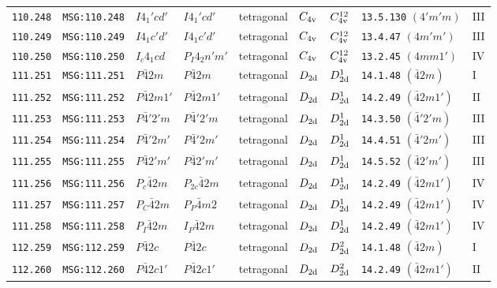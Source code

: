 \documentclass[fleqn,10pt]{jsarticle}
\begin{document}
\begin{center}
\begin{longtable}{lllllllll}
\texttt{110.248} & \texttt{MSG:110.248} & $I4_{1}'cd'$ & $I4_{1}'cd'$ & tetragonal & $C_{\rm 4v}$ & $C_{\rm 4v}^{12}$ & \texttt{13.5.130} $(4'm'm)$ & III \\
\texttt{110.249} & \texttt{MSG:110.249} & $I4_{1}c'd'$ & $I4_{1}c'd'$ & tetragonal & $C_{\rm 4v}$ & $C_{\rm 4v}^{12}$ & \texttt{13.4.47} $(4m'm')$ & III \\
\texttt{110.250} & \texttt{MSG:110.250} & $I_{c}4_{1}cd$ & $P_{I}4_{2}n'm'$ & tetragonal & $C_{\rm 4v}$ & $C_{\rm 4v}^{12}$ & \texttt{13.2.45} $(4mm1')$ & IV \\ \hline
\texttt{111.251} & \texttt{MSG:111.251} & $P\bar{4}2m$ & $P\bar{4}2m$ & tetragonal & $D_{\rm 2d}$ & $D_{\rm 2d}^{1}$ & \texttt{14.1.48} $(\bar{4}2m)$ & I \\
\texttt{111.252} & \texttt{MSG:111.252} & $P\bar{4}2m1'$ & $P\bar{4}2m1'$ & tetragonal & $D_{\rm 2d}$ & $D_{\rm 2d}^{1}$ & \texttt{14.2.49} $(\bar{4}2m1')$ & II \\
\texttt{111.253} & \texttt{MSG:111.253} & $P\bar{4}'2'm$ & $P\bar{4}'2'm$ & tetragonal & $D_{\rm 2d}$ & $D_{\rm 2d}^{1}$ & \texttt{14.3.50} $(\bar{4}'2'm)$ & III \\
\texttt{111.254} & \texttt{MSG:111.254} & $P\bar{4}'2m'$ & $P\bar{4}'2m'$ & tetragonal & $D_{\rm 2d}$ & $D_{\rm 2d}^{1}$ & \texttt{14.4.51} $(\bar{4}'2m')$ & III \\
\texttt{111.255} & \texttt{MSG:111.255} & $P\bar{4}2'm'$ & $P\bar{4}2'm'$ & tetragonal & $D_{\rm 2d}$ & $D_{\rm 2d}^{1}$ & \texttt{14.5.52} $(\bar{4}2'm')$ & III \\
\texttt{111.256} & \texttt{MSG:111.256} & $P_{c}\bar{4}2m$ & $P_{2c}\bar{4}2m$ & tetragonal & $D_{\rm 2d}$ & $D_{\rm 2d}^{1}$ & \texttt{14.2.49} $(\bar{4}2m1')$ & IV \\
\texttt{111.257} & \texttt{MSG:111.257} & $P_{C}\bar{4}2m$ & $P_{P}\bar{4}m2$ & tetragonal & $D_{\rm 2d}$ & $D_{\rm 2d}^{1}$ & \texttt{14.2.49} $(\bar{4}2m1')$ & IV \\
\texttt{111.258} & \texttt{MSG:111.258} & $P_{I}\bar{4}2m$ & $I_{P}\bar{4}2m$ & tetragonal & $D_{\rm 2d}$ & $D_{\rm 2d}^{1}$ & \texttt{14.2.49} $(\bar{4}2m1')$ & IV \\ \hline
\texttt{112.259} & \texttt{MSG:112.259} & $P\bar{4}2c$ & $P\bar{4}2c$ & tetragonal & $D_{\rm 2d}$ & $D_{\rm 2d}^{2}$ & \texttt{14.1.48} $(\bar{4}2m)$ & I \\
\texttt{112.260} & \texttt{MSG:112.260} & $P\bar{4}2c1'$ & $P\bar{4}2c1'$ & tetragonal & $D_{\rm 2d}$ & $D_{\rm 2d}^{2}$ & \texttt{14.2.49} $(\bar{4}2m1')$ & II \\

\end{longtable}
\end{center}
\end{document}

